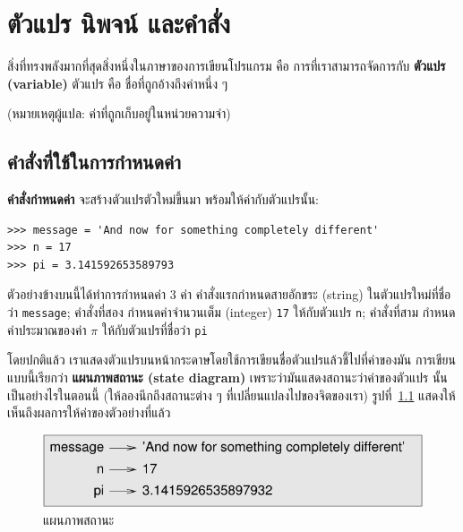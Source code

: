 \chapter{ตัวแปร นิพจน์ และคำสั่ง} %

สิ่งที่ทรงพลังมากที่สุดสิ่งหนึ่งในภาษาของการเขียนโปรแกรม คือ การที่เราสามารถจัดการกับ {\bf ตัวแปร (variable)}  
ตัวแปร คือ ชื่อที่ถูกอ้างถึงค่าหนึ่ง ๆ 

(หมายเหตุผู้แปล: ค่าที่ถูกเก็บอยู่ในหน่วยความจำ) 


\section{คำสั่งที่ใช้ในการกำหนดค่า} %
\label{variables}

{\bf คำสั่งกำหนดค่า} จะสร้างตัวแปรตัวใหม่ขึ้นมา พร้อมให้ค่ากับตัวแปรนั้น:

\begin{verbatim}
>>> message = 'And now for something completely different'
>>> n = 17
>>> pi = 3.141592653589793
\end{verbatim}
%
ตัวอย่างข้างบนนี้ได้ทำการกำหนดค่า 3 ค่า คำสั่งแรกกำหนดสายอักขระ (string) ในตัวแปรใหม่ที่ชื่อว่า
\texttt{message};
คำสั่งที่สอง กำหนดค่าจำนวนเต็ม (integer) \texttt{17} ให้กับตัวแปร {\tt n};
คำสั่งที่สาม กำหนดค่าประมาณของค่า {\scriptsize$\pi$} ให้กับตัวแปรที่ชื่อว่า {\tt pi}

โดยปกติแล้ว เราแสดงตัวแปรบนหน้ากระดาษโดยใช้การเขียนชื่อตัวแปรแล้วชี้ไปที่ค่าของมัน 
การเขียนแบบนี้เรียกว่า {\bf แผนภาพสถานะ (state diagram)} เพราะว่ามันแสดงสถานะว่าค่าของตัวแปร
นั้นเป็นอย่างไรในตอนนี้ (ให้ลองนึกถึงสถานะต่าง ๆ ที่เปลี่ยนแปลงไปของจิตของเรา) 
รูปที่~\ref{fig.state2} แสดงให้เห็นถึงผลการให้ค่าของตัวอย่างที่แล้ว

\begin{figure}
\centerline
{\includegraphics[scale=0.8]{figs/state2.pdf}}
\caption{แผนภาพสถานะ}
\label{fig.state2}
\end{figure}



